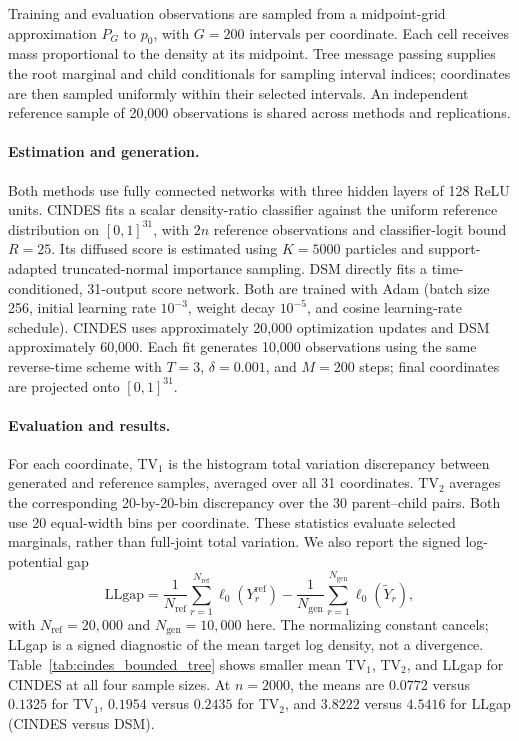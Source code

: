 Training and evaluation observations are sampled from a midpoint-grid
approximation $P_G$ to $p_0$, with $G=200$ intervals per coordinate. Each
cell receives mass proportional to the density at its midpoint. Tree
message passing supplies the root marginal and child conditionals for
sampling interval indices; coordinates are then sampled uniformly within
their selected intervals. An independent reference sample of 20,000
observations is shared across methods and replications.

\paragraph{Estimation and generation.}
Both methods use fully connected networks with three hidden layers of 128
ReLU units. CINDES fits a scalar density-ratio classifier against the uniform
reference distribution on $[0,1]^{31}$, with $2n$ reference observations and
classifier-logit bound $R=25$. Its diffused score is estimated using
$K=5000$ particles and support-adapted truncated-normal importance
sampling. DSM directly fits a time-conditioned, 31-output score network.
Both are trained with Adam (batch size 256, initial learning rate $10^{-3}$,
weight decay $10^{-5}$, and cosine learning-rate schedule). CINDES uses
approximately 20,000 optimization updates and DSM approximately 60,000.
Each fit generates 10,000 observations using the same reverse-time scheme
with $T=3$, $\delta=0.001$, and $M=200$ steps; final coordinates are
projected onto $[0,1]^{31}$.

\paragraph{Evaluation and results.}
For each coordinate, TV$_1$ is the histogram total variation discrepancy
between generated and reference samples, averaged over all 31 coordinates.
TV$_2$ averages the corresponding 20-by-20-bin discrepancy over the 30
parent--child pairs. Both use 20 equal-width bins per coordinate. These
statistics evaluate selected marginals, rather than full-joint total
variation. We also report the signed log-potential gap
\begin{equation}
 \mathrm{LLgap}
 =\frac{1}{N_{\mathrm{ref}}}\sum_{r=1}^{N_{\mathrm{ref}}}
   \ell_0(Y_r^{\mathrm{ref}})
  -\frac{1}{N_{\mathrm{gen}}}\sum_{r=1}^{N_{\mathrm{gen}}}
   \ell_0(\widetilde Y_r),
 \label{eq:supp_llgap}
\end{equation}
with $N_{\mathrm{ref}}=20{,}000$ and $N_{\mathrm{gen}}=10{,}000$ here.
The normalizing constant cancels; LLgap is a signed diagnostic of the mean
target log density, not a divergence. Table~\ref{tab:cindes_bounded_tree}
shows smaller mean TV$_1$, TV$_2$, and LLgap for CINDES at all four sample
sizes. At $n=2000$, the means are $0.0772$ versus $0.1325$ for TV$_1$,
$0.1954$ versus $0.2435$ for TV$_2$, and $3.8222$ versus $4.5416$ for
LLgap (CINDES versus DSM).

